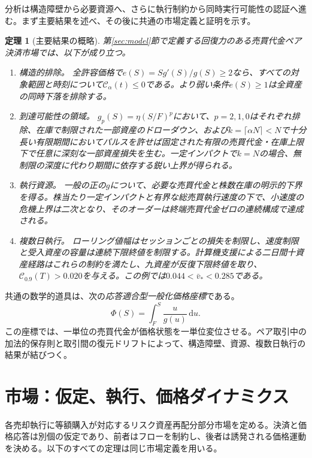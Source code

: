 \documentclass[11pt]{article}
\numberwithin{equation}{section}
\newtheorem{theorem}{定理}[section]
\theoremstyle{definition}
\theoremstyle{remark}
\newcommand{\Cris}{\mathcal{C}}
\newcommand{\dd}{\,\mathrm{d}}
\begin{document}
分析は構造障壁から必要資源へ、さらに執行制約から同時実行可能性の認証へ進む。まず主要結果を述べ、その後に共通の市場定義と証明を示す。

\begin{theorem}[主要結果の概略]\label{thm:informal}
第\ref{sec:model}節で定義する回復力のある売買代金ペア決済市場では、以下が成り立つ。
\begin{enumerate}[label=\textup{(\roman*)},leftmargin= 2 em,itemsep= 0.12 em]
\item \emph{構造的排除。} 全許容価格で$e(S)=Sg'(S)/g(S)\ge2$なら、すべての対象範囲と時刻について$\Cris_\alpha(t)\le0$である。より弱い条件$e(S)\ge1$は全資産の同時下落を排除する。
\item \emph{到達可能性の領域。} $g_p(S)=\eta(S/F)^p$において、$p=2,1,0$はそれぞれ排除、在庫で制限された一部資産のドローダウン、および$k=\lceil\alpha N\rceil<N$で十分長い有限期間においてパルスを許せば固定された有限の売買代金・在庫上限下で任意に深刻な一部資産損失を生む。一定インパクトで$k=N$の場合、無制限の深度に代わり期間に依存する鋭い上界が得られる。
\item \emph{執行資源。} 一般の正の$g$について、必要な売買代金と株数在庫の明示的下界を得る。株当たり一定インパクトと有界な総売買執行速度の下で、小速度の危機上界は二次となり、そのオーダーは終端売買代金ゼロの連続構成で達成される。
\item \emph{複数日執行。} ローリング値幅はセッションごとの損失を制限し、速度制限と受入資産の容量は連続下限終値を制限する。計算機支援による二日間十資産経路はこれらの制約を満たし、九資産が反復下限終値を取り、$\Cris_{0.9}(T)>0.020$を与える。この例では$0.044<\bar v_*<0.285$である。
\end{enumerate}
\end{theorem}

共通の数学的道具は、次の\emph{応答適合型一般化価格座標}である。
\begin{equation}\label{eq:phi-intro}
\Phi(S)=\int_F^S\frac{u}{g(u)}\dd u.
\end{equation}
この座標では、一単位の売買代金が価格状態を一単位変位させる。ペア取引中の加法的保存則と取引間の復元ドリフトによって、構造障壁、資源、複数日執行の結果が結びつく。

\section{市場：仮定、執行、価格ダイナミクス}\label{sec:micro}\label{sec:model}
各売却執行に等額購入が対応するリスク資産再配分部分市場を定める。決済と価格応答は別個の仮定であり、前者はフローを制約し、後者は誘発される価格運動を決める。以下のすべての定理は同じ市場定義を用いる。
\end{document}
